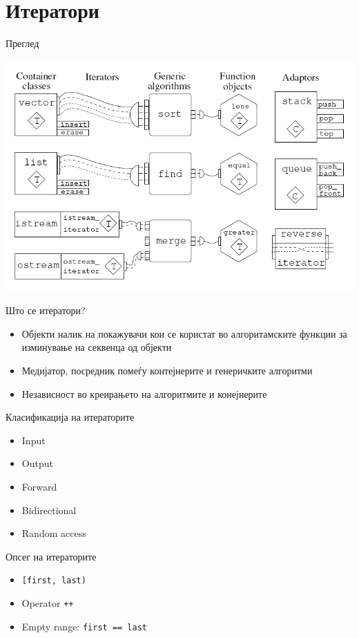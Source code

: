 \section{Итератори}

\begin{frame}{Преглед}
\begin{center}
\includegraphics[width=\textwidth]{images/iterators}
\end{center}
\end{frame}

\begin{frame}{Што се итератори?}
\begin{itemize}
\item Објекти налик на покажувачи кои се користат во алгоритамските функции за
изминување на секвенца од објекти  
\item Медијатор, посредник помеѓу контејнерите и генеричките алгоритми
\item Независност во креирањето на алгоритмите и конејнерите
\end{itemize}
\end{frame}

\begin{frame}{Класификација на итераторите}
\begin{itemize}
\item Input  
\item Output
\item Forward
\item Bidirectional
\item Random access
\end{itemize}
\end{frame}

\begin{frame}{Опсег на итераторите}
\begin{itemize}
\item \texttt{[first, last)}  
\item Operator \texttt{++}
\item Empty range: \texttt{first == last}
\end{itemize}
\end{frame}


